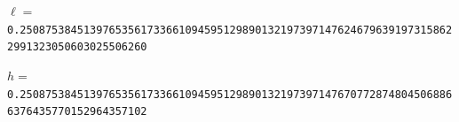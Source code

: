 \begin{center}
\footnotesize
\(\ell=\)\texttt{0.250875384513976535617336610945951298901321973971476246796391973158622991323050603025506260}
\par\smallskip
\(h=\)\texttt{0.250875384513976535617336610945951298901321973971476707728748045068866376435770152964357102}
\end{center}
